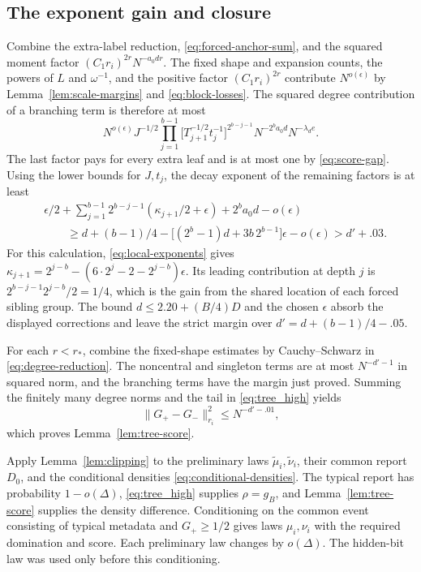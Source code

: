 \subsection{The exponent gain and closure}

Combine the extra-label reduction, \eqref{eq:forced-anchor-sum}, and the squared moment factor $(C_1r_i)^{2r}N^{-a_0dr}$.  The fixed shape and expansion counts, the powers of $L$ and $\omega^{-1}$, and the positive factor $(C_1r_i)^{2r}$ contribute $N^{o(\epsilon)}$ by Lemma~\ref{lem:scale-margins} and \eqref{eq:block-losses}.  The squared degree contribution of a branching term is therefore at most
\[
 N^{o(\epsilon)}J^{-1/2}
 \prod_{j=1}^{b-1}\bigl[T_{j+1}^{-1/2}t_j^{-1}\bigr]^{2^{b-j-1}}
 N^{-2^ba_0d}N^{-\lambda_de}.
\]
The last factor pays for every extra leaf and is at most one by \eqref{eq:score-gap}.  Using the lower bounds for $J,t_j$, the decay exponent of the remaining factors is at least
\begin{align*}
 &\epsilon/2+\sum_{j=1}^{b-1}2^{b-j-1}(\kappa_{j+1}/2+\epsilon)
       +2^ba_0d-o(\epsilon)\\
 &\qquad\ge d+(b-1)/4
       -\bigl[(2^b-1)d+3b\,2^{b-1}\bigr]\epsilon-o(\epsilon)
       >d'+.03.
\end{align*}
For this calculation, \eqref{eq:local-exponents} gives
$\kappa_{j+1}=2^{j-b}-(6\cdot2^j-2-2^{j-b})\epsilon$.  Its leading contribution at depth $j$ is
$2^{b-j-1}2^{j-b}/2=1/4$, which is the gain from the shared location of each forced sibling group.  The bound $d\le2.20+(B/4)D$ and the chosen $\epsilon$ absorb the displayed corrections and leave the strict margin over $d'=d+(b-1)/4-.05$.

For each $r<r_*$, combine the fixed-shape estimates by Cauchy--Schwarz in \eqref{eq:degree-reduction}.  The noncentral and singleton terms are at most $N^{-d'-1}$ in squared norm, and the branching terms have the margin just proved.  Summing the finitely many degree norms and the tail in \eqref{eq:tree_high} yields
\[
 \|G_+-G_-\|_{r_i}^2\le N^{-d'-.01},
\]
which proves Lemma~\ref{lem:tree-score}.

Apply Lemma~\ref{lem:clipping} to the preliminary laws $\widetilde\mu_i,\widetilde\nu_i$, their common report $D_0$, and the conditional densities \eqref{eq:conditional-densities}.  The typical report has probability $1-o(\Delta)$, \eqref{eq:tree_high} supplies $\rho=g_B$, and Lemma~\ref{lem:tree-score} supplies the density difference.  Conditioning on the common event consisting of typical metadata and $G_+\ge1/2$ gives laws $\mu_i,\nu_i$ with the required domination and score.  Each preliminary law changes by $o(\Delta)$.  The hidden-bit law was used only before this conditioning.

